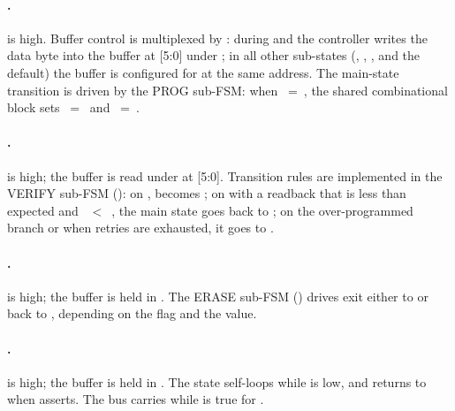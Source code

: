 \paragraph{.}
 is high. Buffer control is multiplexed by
: during  and  the
controller writes the data byte into the buffer at
[5:0] under ; in all other
sub-states (, , ,
and the default) the buffer is configured for  at
the same address. The main-state transition is driven by the PROG
sub-FSM: when ~=~, the shared
combinational block sets ~=~ and
~=~.

\paragraph{.}
 is high; the buffer is read under 
at [5:0]. Transition rules are implemented in the
VERIFY sub-FSM (): on
,  becomes ; on
 with a readback that is less than expected and
~\(<\)~, the main state
goes back to ; on the over-programmed branch or
when retries are exhausted, it goes to .

\paragraph{.}
 is high; the buffer is held in . The ERASE
sub-FSM () drives exit either to
 or back to , depending on the
 flag and the  value.

\paragraph{.}
 is high; the buffer is held in . The
state self-loops while  is low, and returns to
 when  asserts. The
 bus carries  while
 is true for .

